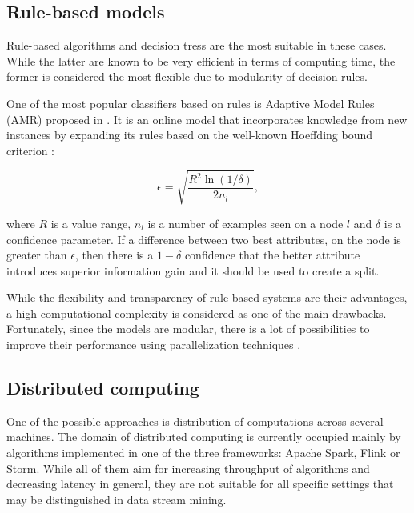 \documentclass[journal]{IEEEtran}
\begin{document}
\subsection{Rule-based models}
Rule-based algorithms and decision tress are the most suitable in these cases. While the latter are known to be very efficient in terms of computing time, the former is considered the most flexible due to modularity of decision rules.

One of the most popular classifiers based on rules is Adaptive Model Rules (AMR) proposed in \cite{Gama:2011}. It is an online model that incorporates knowledge from new instances by expanding its rules based on the well-known Hoeffding bound criterion \cite{Domingos:2000}:

\begin{equation}
\label{eq:hbound}
\epsilon = \sqrt{\frac{R^2\ln(1/\delta)}{2n_l}},
\end{equation} 

\noindent where $R$ is a value range, $n_l$ is a number of examples seen on a node $l$ and $\delta$ is a confidence parameter. If a difference between two best attributes, on the node is greater than $\epsilon$, then there is a $1-\delta$ confidence that the better attribute introduces superior information gain and it should be used to create a split.

While the flexibility and transparency of rule-based systems are their advantages, a high computational complexity is considered as one of the main drawbacks. Fortunately, since the models are modular, there is a lot of possibilities to improve their performance using parallelization techniques \cite{Cano:2018}.

\subsection{Distributed computing}

One of the possible approaches is distribution of computations across several machines. The domain of distributed computing is currently occupied mainly by algorithms implemented in one of the three frameworks: Apache Spark, Flink or Storm. While all of them aim for increasing throughput of algorithms and decreasing latency in general, they are not suitable for all specific settings that may be distinguished in data stream mining.
\end{document}
